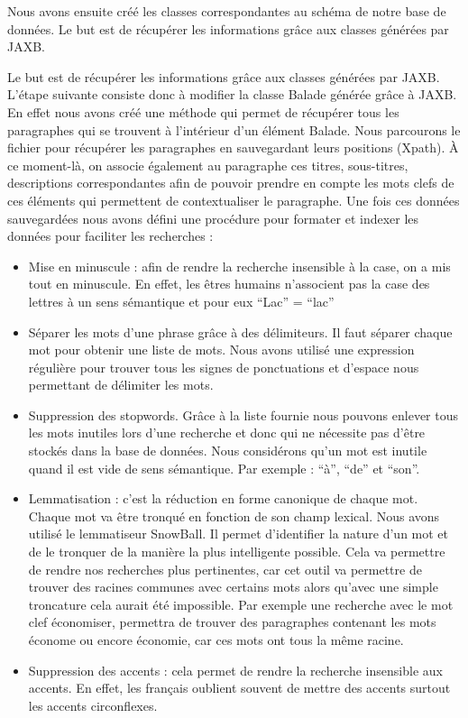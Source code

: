\documentclass{article}
\begin{document}
Nous avons ensuite créé les classes correspondantes au schéma de notre base de
données. Le but est de récupérer les informations grâce aux classes générées par
JAXB. 

Le but est de récupérer les informations grâce aux classes générées par JAXB.
L’étape suivante consiste donc  à modifier la classe Balade générée grâce à JAXB. En
effet nous avons créé une méthode qui permet de récupérer tous les paragraphes qui se
trouvent à l’intérieur d’un élément Balade. Nous parcourons le fichier pour récupérer
les paragraphes en sauvegardant leurs positions (Xpath). À ce moment-là, on associe
également au paragraphe ces titres, sous-titres, descriptions correspondantes afin de
pouvoir prendre en compte les mots clefs de ces éléments qui permettent de
contextualiser le paragraphe.  Une fois ces données sauvegardées nous avons défini
une procédure pour formater et indexer les données pour faciliter les recherches
:

\begin{itemize}

    \item Mise en minuscule : afin de rendre la recherche insensible à la case, on
        a mis tout en minuscule. En effet, les êtres humains n’associent pas la case
        des lettres à un sens sémantique et pour eux “Lac” = “lac”

    \item Séparer les mots d’une phrase grâce à des délimiteurs. Il faut séparer
        chaque mot pour obtenir une liste de mots. Nous avons utilisé une expression
        régulière pour trouver tous les signes de ponctuations et d’espace nous
        permettant de délimiter les mots. 

    \item Suppression des stopwords. Grâce à la liste fournie nous pouvons enlever
        tous les mots inutiles lors d’une recherche et donc qui ne nécessite pas
        d’être stockés dans la base de données. Nous considérons qu’un mot est
        inutile quand il est vide de sens sémantique. Par exemple : “à”, “de” et
        “son”.

    \item Lemmatisation : c’est la réduction en forme canonique de chaque mot. Chaque
        mot va être tronqué en fonction de son champ lexical. Nous avons utilisé le
        lemmatiseur SnowBall. Il permet d’identifier la nature d’un mot et de le
        tronquer de la manière la plus intelligente possible. Cela va permettre de
        rendre nos recherches plus pertinentes, car cet outil va permettre de trouver
        des racines communes avec certains mots alors qu’avec une simple troncature
        cela aurait été impossible. Par exemple une recherche avec le mot clef
        économiser, permettra de trouver des paragraphes contenant les mots économe
        ou encore économie, car ces mots ont tous la même racine.

    \item Suppression des accents :  cela permet de rendre la recherche insensible aux
        accents. En effet, les français oublient souvent de mettre des accents
        surtout les accents circonflexes.

\end{itemize}
\end{document}

